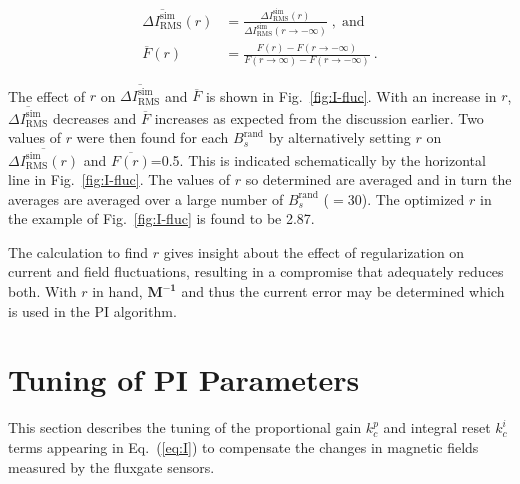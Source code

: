 \begin{align}
    \overline{\Delta I_{\text{RMS}}^{\text{sim}}}(r) &= \frac{\Delta I_{\text{RMS}}^{\text{sim}}(r)}{\Delta I_{\text{RMS}}^{\text{sim}}(r\rightarrow - \infty)} \;\mathrm{,\;and}\label{eq:Inorm}\\
    \overline{F}(r) &= \frac{F(r)- F(r\rightarrow - \infty)}{F(r\rightarrow \infty)- F(r\rightarrow - \infty)}~\text{.}\label{eq:flucNorm}
\end{align}


The effect of $r$ on $\overline{\Delta I_{\text{RMS}}^{\text{sim}}}$ and $\overline{F}$ is shown in Fig.~\ref{fig:I-fluc}. With an increase in $r$, $\overline{\Delta I_{\text{RMS}}^{\text{sim}}}$ decreases and $\overline{F}$ increases as expected from the discussion earlier.
Two values of $r$ were then found for each $B_s^{\text{rand}}$ by alternatively setting $r$ on $\overline{\Delta I_{\text{RMS}}^{\text{sim}}(r)}$ and $\overline{F(r)}$=0.5. This is indicated schematically by the horizontal line in Fig.~\ref{fig:I-fluc}. The values of $r$ so determined are averaged and in turn the averages are averaged over a large number of $B_s^{\text{rand}}$ ($=30$). The optimized $r$ in the example of Fig.~\ref{fig:I-fluc} is found to be 2.87.

The calculation to find $r$ gives insight about the effect of regularization on current and field fluctuations, resulting in a compromise that adequately reduces both. With $r$ in hand, $\bm{M^{-1}}$ and thus the current error may be determined which is used in the PI algorithm.

\section{Tuning of PI Parameters}\label{sec:tune}
This section describes the tuning of the proportional gain $k_c^p$ and integral reset $k_c^i$ terms appearing in Eq.~(\ref{eq:I}) to compensate the changes in magnetic fields measured by the fluxgate sensors.

